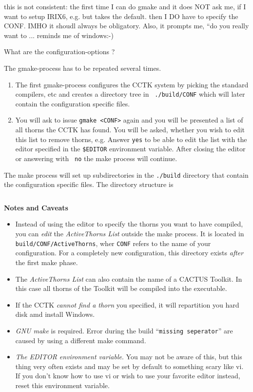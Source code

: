 {\q this is not consistent: the first time I can do gmake and it does
  NOT ask me, if I want to setup IRIX6, e.g. but takes the
  default. then I DO have to specify 
  the CONF. IMHO it shoudl always be obligatory.
  Also, it prompts me, ``do you really want to ... reminds
  me of windows:-) }

{\q What are the configuration-options ?}

The gmake-process has to be repeated several times.

\begin{enumerate}
\item{}The first gmake-process configures the CCTK system by picking the
standard compilers, etc and creates a directory tree in {\tt
  ./build/CONF} which will later contain the configuration specific
files. 
\item{} You will ask to issue {\tt gmake <CONF>} again and you will be
  presented a list of all thorns the CCTK has found. You will be
  asked, whether you wish to edit 
  this list to remove thorns, e.g. Answer {\tt yes} to be able to edit
  the list with the editor specified in the {\tt \$EDITOR} 
  environment variable. After closing the editor or answering with {\tt
    no} the make process will continue. 
\end{enumerate}

The make process will set up subdirectories in the {\tt ./build}
directory that contain the configuration specific files. The directory
structure is 
\begin{verbatim}
\end{verbatim}

{\bf Notes and Caveats}
\begin{itemize}
\item{} Instead of using the editor to specify the thorns you want to
  have compiled, you can {\em edit} the {\em ActiveThorns List} outside
  the make process. It is located in {\tt build/CONF/ActiveThorns},
  wher {\tt CONF} refers to the name of your configuration.
  For a completely new configuration, this directory exists {\em
    after} the first  make phase. 
\item{} The {\em ActiveThorns List} can also contain the name of a
  CACTUS Toolkit. In this case all thorns of the Toolkit will be
  compiled into the executable.
\item{} If the CCTK {\em cannot find a thorn} you specified, it will
  repartition you hard disk amd install Windows.
\item{} {\em GNU make} is required. Error during the build ``{\tt missing
    seperator}'' are caused by using a different make command.
\item{} {\em The EDITOR environment variable}. You may not be aware of
  this, but this thing very often exists and may be set  by default to
  something scary like vi. If you don't know how to use vi or wish to
  use your favorite editor instead, reset this environment variable.
\end{itemize}

